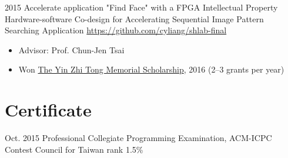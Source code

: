 \documentclass[11pt,a4paper,sans,english]{moderncv}
\begin{document}
    \cventry
        {2015}
        {Accelerate application "Find Face" with a FPGA Intellectual Property}
        {Hardware-software Co-design for Accelerating Sequential Image Pattern Searching Application}
        {}
        {\href{https://github.com/cyliang/shlab-final}{\textnormal{https://github.com/cyliang/shlab-final}}}
        {\begin{itemize}
        \item Advisor: Prof. Chun-Jen Tsai
        \item Won \underline{The Yin Zhi Tong Memorial Scholarship}, 2016 (2--3 grants per year)
        \end{itemize}%
        }

        
        
\section{Certificate}
    \cventry
        {Oct. 2015} %
        {Professional} %
        {Collegiate Programming Examination, ACM-ICPC Contest Council for Taiwan} %
        {}
        {rank 1.5\%} %
        {}

\end{document}

